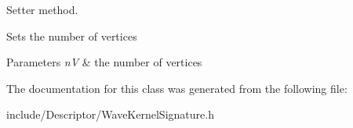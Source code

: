 Setter method. 

Sets the number of vertices 
\begin{DoxyParams}{Parameters}
{\em n\-V} & the number of vertices \\
\hline
\end{DoxyParams}


The documentation for this class was generated from the following file\-:\begin{DoxyCompactItemize}
\item 
include/\-Descriptor/Wave\-Kernel\-Signature.\-h\end{DoxyCompactItemize}
